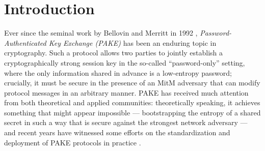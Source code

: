 \documentclass{article}
\theoremstyle{plain}
\theoremstyle{definition}
\theoremstyle{remark}
\begin{document}
\newpage\tableofcontents\newpage

\section{Introduction}
\label{sec:intro}
Ever since the seminal work by Bellovin and Merritt in 1992 \cite{SP:BelMer92}, \emph{Password-Authenticated Key Exchange (PAKE)} has been an enduring topic in cryptography. Such a protocol allows two parties to jointly establish a cryptographically strong session key in the so-called ``password-only'' setting, where the only information shared in advance is a low-entropy password; crucially, it must be secure in the presence of an MitM adversary that can modify protocol messages in an arbitrary manner. PAKE has received much attention from both theoretical and applied communities: theoretically speaking, it achieves something that might appear impossible --- bootstrapping the entropy of a shared secret in such a way that is secure against the strongest network adversary --- and recent years have witnessed some efforts on the standardization and deployment of PAKE protocols in practice \cite{pake-selection}.
\end{document}
